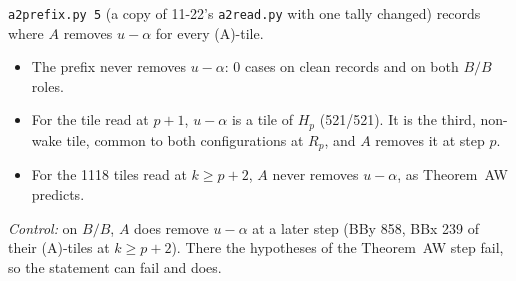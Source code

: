 \documentclass[11pt]{article}
\theoremstyle{definition}\newtheorem{definition}[theorem]{Definition}\newtheorem{remark}[theorem]{Remark}
\begin{document}
\texttt{a2prefix.py 5} (a copy of 11-22's \texttt{a2read.py} with one tally changed) records where $A$ removes $u-\alpha$ for every (A)-tile.
\begin{itemize}
\item The prefix never removes $u-\alpha$: 0 cases on clean records and on both $B/B$ roles.
\item For the tile read at $p+1$, $u-\alpha$ is a tile of $H_p$ (521/521). It is the third, non-wake tile, common to both configurations at $R_p$, and $A$ removes it at step $p$.
\item For the 1118 tiles read at $k\ge p+2$, $A$ never removes $u-\alpha$, as Theorem~AW predicts.
\end{itemize}
\emph{Control:} on $B/B$, $A$ does remove $u-\alpha$ at a later step (BBy 858, BBx 239 of their (A)-tiles at $k\ge p+2$). There the hypotheses of the Theorem~AW step fail, so the statement can fail and does.
\end{document}
